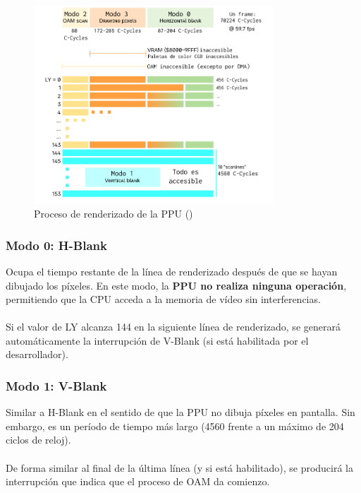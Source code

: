 \begin{figure}[H]
    \centering
    \includegraphics[width=0.8\textwidth]{include/images/render_gb.png}
    \caption{Proceso de renderizado de la PPU (\cite{newpandocs})}
    \label{figure:gb_render}
\end{figure}

\subsubsection{Modo 0: H-Blank}
Ocupa el tiempo restante de la línea de renderizado después de que se hayan dibujado los píxeles. En este modo, la \textbf{PPU no realiza ninguna operación}, permitiendo que la CPU acceda a la memoria de vídeo sin interferencias.
\\\\
Si el valor de LY alcanza 144 en la siguiente línea de renderizado, se generará automáticamente la interrupción de V-Blank (si está habilitada por el desarrollador).

\subsubsection{Modo 1: V-Blank}
Similar a H-Blank en el sentido de que la PPU no dibuja píxeles en pantalla. Sin embargo, es un período de tiempo más largo (4560 frente a un máximo de 204 ciclos de reloj).
\\\\
De forma similar al final de la última línea (y si está habilitado), se producirá la interrupción que indica que el proceso de OAM da comienzo.

